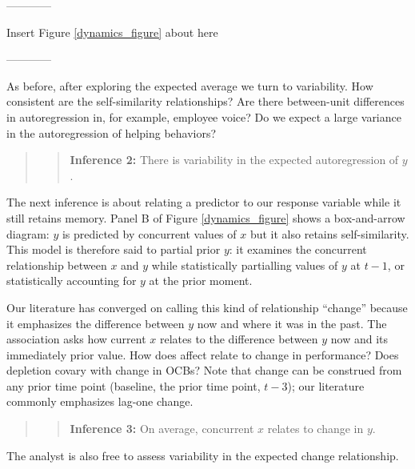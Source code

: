 \documentclass[english,,man]{apa6}
\theoremstyle{definition}
\theoremstyle{definition}
\theoremstyle{definition}
\theoremstyle{remark}
\begin{document}
\begin{center}

------------

Insert Figure \ref{dynamics_figure} about here

------------

\end{center}

As before, after exploring the expected average we turn to variability.
How consistent are the self-similarity relationships? Are there
between-unit differences in autoregression in, for example, employee
voice? Do we expect a large variance in the autoregression of helping
behaviors?

\begin{quote}
\begin{quote}
\textbf{Inference 2:} There is variability in the expected
autoregression of \(y\).
\end{quote}
\end{quote}

The next inference is about relating a predictor to our response
variable while it still retains memory. Panel B of Figure
\ref{dynamics_figure} shows a box-and-arrow diagram: \(y\) is predicted
by concurrent values of \(x\) but it also retains self-similarity. This
model is therefore said to partial prior \(y\): it examines the
concurrent relationship between \(x\) and \(y\) while statistically
partialling values of \(y\) at \(t - 1\), or statistically accounting
for \(y\) at the prior moment.

Our literature has converged on calling this kind of relationship
\enquote{change} because it emphasizes the difference between \(y\) now
and where it was in the past. The association asks how current \(x\)
relates to the difference between \(y\) now and its immediately prior
value. How does affect relate to change in performance? Does depletion
covary with change in OCBs? Note that change can be construed from any
prior time point (baseline, the prior time point, \(t-3\)); our
literature commonly emphasizes lag-one change.

\begin{quote}
\begin{quote}
\textbf{Inference 3:} On average, concurrent \(x\) relates to change in
\(y\).
\end{quote}
\end{quote}

The analyst is also free to assess variability in the expected change
relationship.
\end{document}
